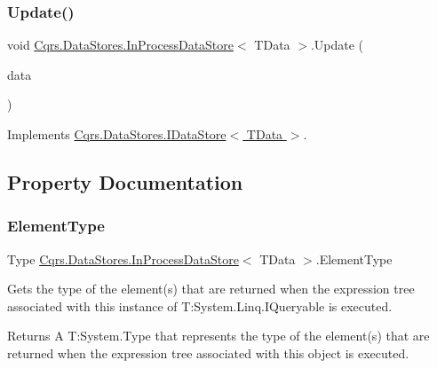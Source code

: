 \subsubsection{\texorpdfstring{Update()}{Update()}}
{\footnotesize\ttfamily void \hyperlink{classCqrs_1_1DataStores_1_1InProcessDataStore}{Cqrs.\+Data\+Stores.\+In\+Process\+Data\+Store}$<$ T\+Data $>$.Update (\begin{DoxyParamCaption}\item[{T\+Data}]{data }\end{DoxyParamCaption})}



Implements \hyperlink{interfaceCqrs_1_1DataStores_1_1IDataStore_a6d5d4dd572de8db01ff0c48d37faefa7_a6d5d4dd572de8db01ff0c48d37faefa7}{Cqrs.\+Data\+Stores.\+I\+Data\+Store$<$ T\+Data $>$}.



\subsection{Property Documentation}
\mbox{\label{classCqrs_1_1DataStores_1_1InProcessDataStore_aacc8434efa0250be78dda57e159a5aa8_aacc8434efa0250be78dda57e159a5aa8}} 
\subsubsection{\texorpdfstring{Element\+Type}{ElementType}}
{\footnotesize\ttfamily Type \hyperlink{classCqrs_1_1DataStores_1_1InProcessDataStore}{Cqrs.\+Data\+Stores.\+In\+Process\+Data\+Store}$<$ T\+Data $>$.Element\+Type\hspace{0.3cm}{\ttfamily [get]}}



Gets the type of the element(s) that are returned when the expression tree associated with this instance of T\+:\+System.\+Linq.\+I\+Queryable is executed. 

\begin{DoxyReturn}{Returns}
A T\+:\+System.\+Type that represents the type of the element(s) that are returned when the expression tree associated with this object is executed. 
\end{DoxyReturn}
\mbox{\label{classCqrs_1_1DataStores_1_1InProcessDataStore_a459174c411a0df2b4ec1e48a3b36f884_a459174c411a0df2b4ec1e48a3b36f884}} 
